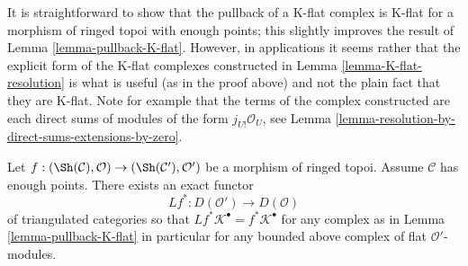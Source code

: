 \begin{remark}
\label{remark-pullback-K-flat}
It is straightforward to show that the pullback of a K-flat complex
is K-flat for a morphism of ringed topoi with enough points; this slightly
improves the result of
Lemma \ref{lemma-pullback-K-flat}.
However, in applications it seems rather that the explicit form of the K-flat
complexes constructed in
Lemma \ref{lemma-K-flat-resolution}
is what is useful (as in the proof above) and not the plain fact that they
are K-flat. Note for example that the terms of the complex constructed
are each direct sums of modules of the form $j_{U!}\mathcal{O}_U$, see
Lemma \ref{lemma-resolution-by-direct-sums-extensions-by-zero}.
\end{remark}

\begin{lemma}
\label{lemma-derived-base-change}
Let
$f : (\Sh(\mathcal{C}), \mathcal{O}) \to
(\Sh(\mathcal{C}'), \mathcal{O}')$
be a morphism of ringed topoi. Assume $\mathcal{C}$ has enough points.
There exists an exact functor
$$
Lf^* : D(\mathcal{O}') \longrightarrow D(\mathcal{O})
$$
of triangulated categories so that
$Lf^*\mathcal{K}^\bullet = f^*\mathcal{K}^\bullet$ for any complex as in
Lemma \ref{lemma-pullback-K-flat}
in particular for any bounded above complex of flat $\mathcal{O}'$-modules.
\end{lemma}

